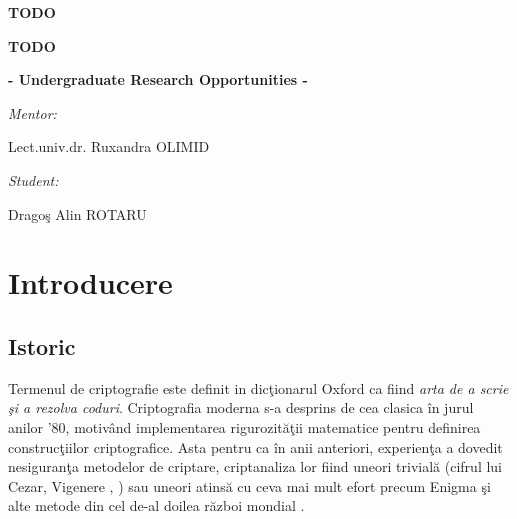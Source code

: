 \documentclass{llncs}
\begin{document}
\thispagestyle{empty}




\vspace{10.5cm}


\centerline{\huge \bf TODO}
\vspace{0.35cm}
\centerline{\huge \bf  TODO}


\vspace{1cm}

\centerline{\large \bf - Undergraduate Research Opportunities -}

\vspace{5.5cm}

\begin{flushleft}
{\Large \textit{Mentor:}\vspace{0.2cm}}

{\large Lect.univ.dr. Ruxandra OLIMID}
\end{flushleft}

\vspace{3cm}
\begin{flushright}
{\Large \textit{Student:}\vspace{0.2cm}}

{\Large Drago\c{s} Alin ROTARU}
\end{flushright}


\vspace{3.5cm}




\tableofcontents
\newpage

\section{Introducere}
\label{sec:intro}

\subsection{Istoric}
Termenul de criptografie este definit in dic\c{t}ionarul Oxford ca fiind \textit{arta de a scrie \c{s}i a rezolva coduri}.
Criptografia moderna s-a desprins de cea clasica \^{i}n jurul anilor '80, motiv\^{a}nd implementarea rigurozit\u{a}\c{t}ii matematice pentru definirea construc\c{t}iilor criptografice. Asta pentru ca \^{i}n anii anteriori, experien\c{t}a a dovedit nesiguran\c{t}a metodelor de criptare, criptanaliza lor fiind uneori trivial\u{a} (cifrul lui Cezar, Vigenere \cite{Caesar:2015}, \cite{Vigenere:2015}) sau uneori atins\u{a} cu ceva mai mult efort precum Enigma \c{s}i alte metode din cel de-al doilea r\u{a}zboi mondial \cite{Enigma:2015}.
\end{document}
